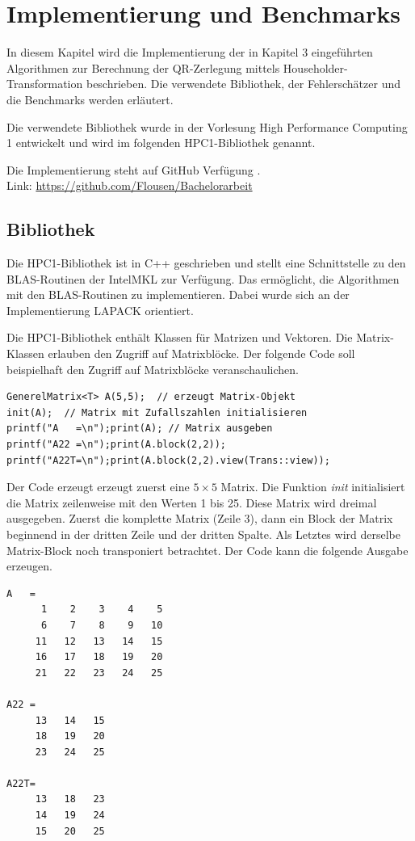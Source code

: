\chapter{Implementierung und Benchmarks}

In diesem Kapitel wird die Implementierung der in Kapitel 3 eingeführten Algorithmen zur Berechnung der QR-Zerlegung mittels Householder-Transformation beschrieben. 
Die verwendete Bibliothek, der Fehlerschätzer und die Benchmarks werden erläutert. 

Die verwendete Bibliothek wurde in der Vorlesung High Performance Computing 1 entwickelt \cite{HPC1} und wird im folgenden HPC1-Bibliothek genannt.


Die Implementierung steht auf GitHub Verfügung \cite{git}.\\
Link: \url{https://github.com/Flousen/Bachelorarbeit}

\section{Bibliothek}
Die HPC1-Bibliothek ist in C++ geschrieben und stellt eine Schnittstelle zu den BLAS-Routinen der IntelMKL zur Verfügung.
Das ermöglicht, die Algorithmen mit den BLAS-Routinen zu implementieren.
Dabei wurde sich an der Implementierung LAPACK orientiert.


Die HPC1-Bibliothek enthält Klassen für Matrizen und Vektoren.
Die Matrix-Klassen erlauben den Zugriff auf Matrixblöcke. 
Der folgende Code soll beispielhaft den Zugriff auf Matrixblöcke veranschaulichen.
\begin{lstlisting}
GenerelMatrix<T> A(5,5);  // erzeugt Matrix-Objekt
init(A);  // Matrix mit Zufallszahlen initialisieren
printf("A   =\n");print(A); // Matrix ausgeben
printf("A22 =\n");print(A.block(2,2));
printf("A22T=\n");print(A.block(2,2).view(Trans::view));
\end{lstlisting}
Der Code erzeugt erzeugt zuerst eine $5 \times 5$ Matrix.
Die Funktion \textit{init} initialisiert die Matrix zeilenweise mit den Werten 1 bis 25.
Diese Matrix wird dreimal ausgegeben. Zuerst die komplette Matrix (Zeile 3), dann ein Block der Matrix beginnend in der dritten Zeile und der dritten Spalte. Als Letztes wird derselbe Matrix-Block noch transponiert betrachtet. Der Code kann die folgende Ausgabe erzeugen.
\lstset{numbers=none}
\begin{lstlisting} 
A   = 
      1    2    3    4    5
      6    7    8    9   10
     11   12   13   14   15
     16   17   18   19   20
     21   22   23   24   25

A22 = 
     13   14   15
     18   19   20
     23   24   25

A22T= 
     13   18   23
     14   19   24
     15   20   25
\end{lstlisting}


